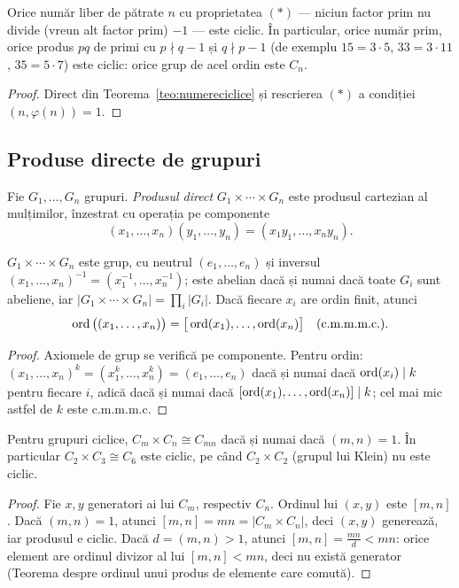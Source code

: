 \begin{corolar}
Orice număr liber de pătrate $n$ cu proprietatea $(\ast)$ --- niciun factor prim nu divide (vreun alt factor prim) $-1$ --- este ciclic. În particular, orice număr prim, orice produs $pq$ de primi cu $p\nmid q-1$ și $q\nmid p-1$ (de exemplu $15=3\cdot5$, $33=3\cdot11$, $35=5\cdot7$) este ciclic: orice grup de acel ordin este $C_n$.
\end{corolar}

\begin{proof}
Direct din Teorema~\ref{teo:numereciclice} și rescrierea $(\ast)$ a condiției $(n,\varphi(n))=1$.
\end{proof}

\subsection{Produse directe de grupuri}\label{sec:produsedirecte}

\begin{definitie}
Fie $G_1,\dots,G_n$ grupuri. \emph{Produsul direct} $G_1\times\cdots\times G_n$ este produsul cartezian al mulțimilor, înzestrat cu operația pe componente
\[
(x_1,\dots,x_n)(y_1,\dots,y_n)=(x_1y_1,\dots,x_ny_n).
\]
\end{definitie}

\begin{propozitie}
$G_1\times\cdots\times G_n$ este grup, cu neutrul $(e_1,\dots,e_n)$ și inversul $(x_1,\dots,x_n)^{-1}=(x_1^{-1},\dots,x_n^{-1})$; este abelian dacă și numai dacă toate $G_i$ sunt abeliene, iar $|G_1\times\cdots\times G_n|=\prod_i|G_i|$. Dacă fiecare $x_i$ are ordin finit, atunci
\[
\operatorname{ord}\big((x_1,\dots,x_n)\big)=\big[\operatorname{ord}(x_1),\dots,\operatorname{ord}(x_n)\big]\quad(\text{c.m.m.m.c.}).
\]
\end{propozitie}
\begin{proof}
Axiomele de grup se verifică pe componente. Pentru ordin: $(x_1,\dots,x_n)^k=(x_1^k,\dots,x_n^k)=(e_1,\dots,e_n)$ dacă și numai dacă $\operatorname{ord}(x_i)\mid k$ pentru fiecare $i$, adică dacă și numai dacă $[\operatorname{ord}(x_1),\dots,\operatorname{ord}(x_n)]\mid k$; cel mai mic astfel de $k$ este c.m.m.m.c.
\end{proof}

\begin{corolar}\label{cor:produsciclic}
Pentru grupuri ciclice, $C_m\times C_n\cong C_{mn}$ dacă și numai dacă $(m,n)=1$. În particular $C_2\times C_3\cong C_6$ este ciclic, pe când $C_2\times C_2$ (grupul lui Klein) nu este ciclic.
\end{corolar}
\begin{proof}
Fie $x,y$ generatori ai lui $C_m$, respectiv $C_n$. Ordinul lui $(x,y)$ este $[m,n]$. Dacă $(m,n)=1$, atunci $[m,n]=mn=|C_m\times C_n|$, deci $(x,y)$ generează, iar produsul e ciclic. Dacă $d=(m,n)>1$, atunci $[m,n]=\tfrac{mn}{d}<mn$: orice element are ordinul divizor al lui $[m,n]<mn$, deci nu există generator (Teorema despre ordinul unui produs de elemente care comută).
\end{proof}

